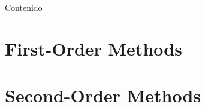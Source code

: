 \documentclass{beamer}
\begin{document}


\begin{frame}{Contenido}
\tableofcontents
\end{frame}

\section{First-Order Methods}








\section{Second-Order Methods}




\end{document}
